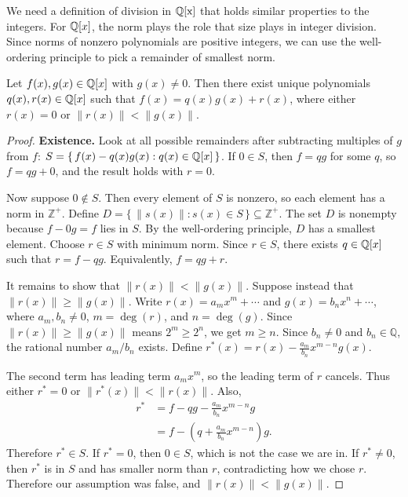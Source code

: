 We need a definition of division in $\operatorname{\mathbb{Q}[x]}$ that holds similar properties to the integers.
For $\mathbb{Q}[x]$, the norm plays the role that size plays in integer division. Since norms of nonzero polynomials are positive integers, we can use the well-ordering principle to pick a remainder of smallest norm.

\begin{theorem}
Let $f(x),g(x)\in\mathbb{Q}[x]$ with $g(x)\neq0$. Then there exist unique polynomials $q(x),r(x)\in\mathbb{Q}[x]$ such that $f(x)=q(x)g(x)+r(x)$, where either $r(x)=0$ or $\|r(x)\|<\|g(x)\|$.
\end{theorem}

\begin{proof}
\textbf{Existence.}
Look at all possible remainders after subtracting multiples of $g$ from $f$: $S=\{\,f(x)-q(x)g(x):q(x)\in\mathbb{Q}[x]\,\}$. If $0\in S$, then $f=qg$ for some $q$, so $f=qg+0$, and the result holds with $r=0$.

Now suppose $0\notin S$. Then every element of $S$ is nonzero, so each element has a norm in $\mathbb{Z}^+$. Define $D=\{\,\|s(x)\|:s(x)\in S\,\}\subseteq\mathbb{Z}^+$. The set $D$ is nonempty because $f-0g=f$ lies in $S$. By the well-ordering principle, $D$ has a smallest element. Choose $r\in S$ with minimum norm. Since $r\in S$, there exists $q\in\mathbb{Q}[x]$ such that $r=f-qg$. Equivalently, $f=qg+r$.

It remains to show that $\|r(x)\|<\|g(x)\|$. Suppose instead that $\|r(x)\|\geq\|g(x)\|$. Write $r(x)=a_mx^m+\cdots$ and $g(x)=b_nx^n+\cdots$, where $a_m,b_n\neq0$, $m=\deg(r)$, and $n=\deg(g)$. Since $\|r(x)\|\geq\|g(x)\|$ means $2^m\geq2^n$, we get $m\geq n$. Since $b_n\neq0$ and $b_n\in\mathbb{Q}$, the rational number $a_m/b_n$ exists. Define $r^*(x)=r(x)-\frac{a_m}{b_n}x^{m-n}g(x)$.

The second term has leading term $a_mx^m$, so the leading term of $r$ cancels. Thus either $r^*=0$ or $\|r^*(x)\|<\|r(x)\|$. Also,
\[
\begin{aligned}
r^*
&=f-qg-\frac{a_m}{b_n}x^{m-n}g\\
&=f-\left(q+\frac{a_m}{b_n}x^{m-n}\right)g.
\end{aligned}
\]
Therefore $r^*\in S$. If $r^*=0$, then $0\in S$, which is not the case we are in. If $r^*\neq0$, then $r^*$ is in $S$ and has smaller norm than $r$, contradicting how we chose $r$. Therefore our assumption was false, and $\|r(x)\|<\|g(x)\|$.


\end{proof}
